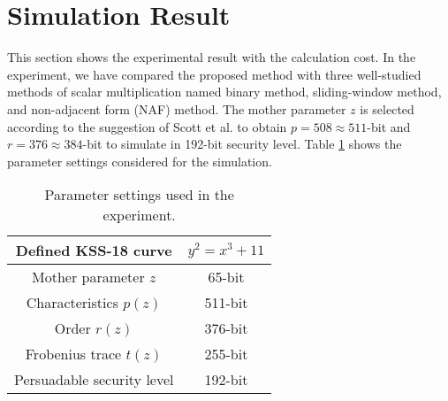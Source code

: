 \section{Simulation Result}
This section shows the experimental result with the calculation cost.
In the experiment, we have compared the proposed method with three well-studied methods of scalar multiplication named binary method, sliding-window method, and non-adjacent form (NAF) method. 
The mother parameter $z$ is  selected according to the suggestion of Scott et al. \cite{IMA:Scott11} to obtain $p = 508 \approx 511$-bit and $r =  376 \approx 384$-bit  to simulate in 192-bit security level.
Table \ref{table:parameters_chapter_g2scm_kss18} shows the parameter settings considered for the simulation.

\renewcommand{\baselinestretch}{1.5}
\begin{table}[htb]
	\begin{center}
		\caption{Parameter settings used in the experiment.}
		\begin{tabular}{|c|c|}
			\hline
			Defined KSS-18 curve & $y^2 = x^3 + 11$ \\ \hline
			Mother parameter $z$ & 65-bit \\ \hline
			Characteristics  $p(z)$ & 511-bit \\ \hline
			Order  $r(z)$ & 376-bit \\ \hline
			Frobenius trace $t(z)$ & 255-bit \\ \hline
			Persuadable security level & 192-bit \\ \hline
		\end{tabular}
		\label{table:parameters_chapter_g2scm_kss18}
	\end{center}
\end{table}
\renewcommand{\baselinestretch}{1.0}

